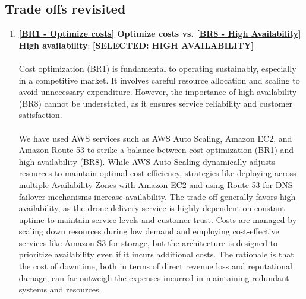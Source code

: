 \documentclass{article}
\begin{document}
\subsection{Trade offs revisited}
\begin{enumerate}
    \item \textbf{\ref{BR1 - Optimize costs} Optimize costs vs. \ref{BR8 - High Availability} High availability}: \textbf{[SELECTED: HIGH AVAILABILITY]}\\\\
    Cost optimization (BR1) is fundamental to operating sustainably, especially in a competitive market. It involves careful resource allocation and scaling to avoid unnecessary expenditure. However, the importance of high availability (BR8) cannot be understated, as it ensures service reliability and customer satisfaction. \\\\
    We have used AWS services such as AWS Auto Scaling, Amazon EC2, and Amazon Route 53 to strike a balance between cost optimization (BR1) and high availability (BR8). While AWS Auto Scaling dynamically adjusts resources to maintain optimal cost efficiency, strategies like deploying across multiple Availability Zones with Amazon EC2 and using Route 53 for DNS failover mechanisms increase availability. The trade-off generally favors high availability, as the drone delivery service is highly dependent on constant uptime to maintain service levels and customer trust. Costs are managed by scaling down resources during low demand and employing cost-effective services like Amazon S3 for storage, but the architecture is designed to prioritize availability even if it incurs additional costs. The rationale is that the cost of downtime, both in terms of direct revenue loss and reputational damage, can far outweigh the expenses incurred in maintaining redundant systems and resources.


\end{enumerate}
\end{document}
